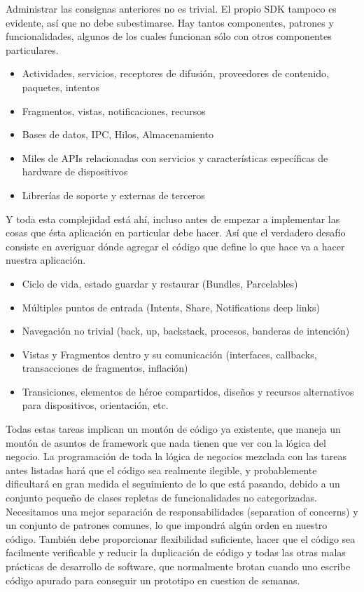 Administrar las consignas anteriores no es trivial. El propio SDK tampoco es evidente, así que no debe subestimarse. Hay tantos componentes, patrones y funcionalidades, algunos de los cuales funcionan sólo con otros componentes particulares.

\begin{itemize}
	\item Actividades, servicios, receptores de difusión, proveedores de contenido, paquetes, intentos
	\item Fragmentos, vistas, notificaciones, recursos
	\item Bases de datos, IPC, Hilos, Almacenamiento
	\item Miles de APIs relacionadas con servicios y características específicas de hardware de dispositivos
	\item Librerías de soporte y externas de terceros
	
\end{itemize}

Y toda esta complejidad está ahí, incluso antes de empezar a implementar las cosas que ésta aplicación en particular debe hacer. Así que el verdadero desafío consiste en averiguar dónde agregar el código que define lo que hace va a hacer nuestra aplicación.

\begin{itemize}
	\item Ciclo de vida, estado guardar y restaurar (Bundles, Parcelables)
	\item Múltiples puntos de entrada (Intents, Share, Notifications deep links)
	\item Navegación no trivial (back, up, backstack, procesos, banderas de intención)
	\item Vistas y Fragmentos dentro y su comunicación (interfaces, callbacks, transacciones de fragmentos, inflación)
	\item Transiciones, elementos de héroe compartidos, diseños y recursos alternativos para dispositivos, orientación, etc.
	
\end{itemize}

Todas estas tareas implican un montón de código ya existente, que maneja un montón de asuntos de framework que nada tienen que ver con la lógica del negocio. La programación de toda la lógica de negocios mezclada con las tareas antes listadas hará que el código sea realmente ilegible, y probablemente dificultará en gran medida el  seguimiento de lo que está pasando, debido a un conjunto pequeño de clases repletas de funcionalidades no categorizadas. Necesitamos una mejor separación de responsabilidades (separation of concerns) y un conjunto de patrones comunes, lo que impondrá algún orden en nuestro código. También debe proporcionar flexibilidad suficiente, hacer que el código sea facilmente verificable y reducir la duplicación de código y todas las otras malas prácticas de desarrollo de software, que normalmente brotan cuando uno escribe código apurado para conseguir un prototipo en cuestion de semanas.